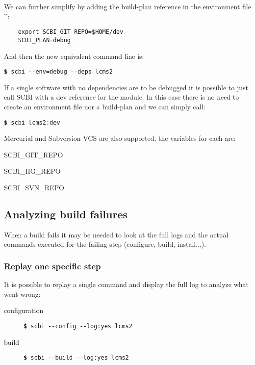 \documentclass[a4paper,12pt,twoside]{article}
\newcommand{\file}[1]{'{\path{#1}}'}
\newcommand{\cmd}[1]{\tabto{1cm}\hspace{0.5cm}\texttt{\textbf{\$} #1}}
\newcommand{\ddash}{-{}-}
\begin{document}
We can further simplify by adding the build-plan reference in the environment file \file{.env-debug}:

\begin{lstlisting}
	export SCBI_GIT_REPO=$HOME/dev
	SCBI_PLAN=debug
\end{lstlisting}

And then the new equivalent command line is:

\cmd{scbi \ddash{}env=debug \ddash{}deps lcms2}

If a single software with no dependencies are to be debugged it is possible to just call SCBI with a dev reference for the module. In this case there is no need to create an environment file nor a build-plan and we can simply call:

\cmd{scbi lcms2:dev}

Mercurial and Subversion VCS are also supported, the variables for each are:

\begin{description}[style=standard]
	\item[Git] \tabto{3cm} SCBI\_GIT\_REPO
	\item[Mercurial] \tabto{3cm} SCBI\_HG\_REPO
	\item[Subversion] \tabto{3cm} SCBI\_SVN\_REPO
\end{description}

\subsection{Analyzing build failures}
\label{debugging}

When a build fails it may be needed to look at the full logs and the actual commands executed for the failing step (configure, build, install...).

\subsubsection{Replay one specific step}

It is possible to replay a single command and display the full log to analyze what went wrong:

\begin{description}
	\item[configuration] \tabto{3cm}  \cmd{scbi \ddash{}config \ddash{}log:yes lcms2}
	\item[build] \tabto{3cm} \cmd{scbi \ddash{}build \ddash{}log:yes lcms2}
\end{description}
\end{document}
